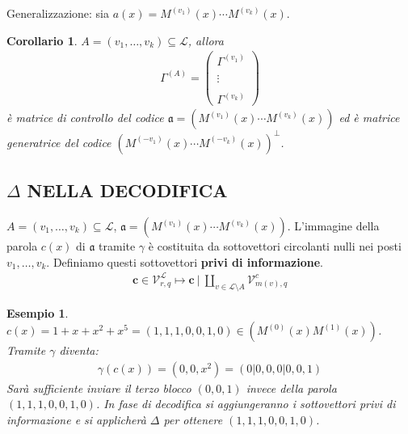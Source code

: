 \documentclass[mathserif]{beamer}
\newtheorem{esempio}{Esempio}
\newtheorem{corollario}{Corollario}
\begin{document}
\begin{frame}
  Generalizzazione: sia $a(x) = M^{(v_{1})}(x) \cdots M^{(v_{k})}(x)$. 

    \begin{corollario}
      $A=(v_{1}, \dots, v_{k}) \subseteq \mathscr{L}$, allora
      \begin{align*}
	  \Gamma^{(A)}
	  =
	  \left(
	  \begin{array} { c }
	  \Gamma^{(v_{1})}  \\ \\
	  \vdots \\ \\
	  \Gamma^{(v_{k})} 
	  \end{array}
	  \right)
      \end{align*}
      è matrice di controllo del codice $\mathfrak{a} = (  M^{(v_{1})}(x) \cdots M^{(v_{k})}(x) )$
      ed è matrice generatrice del codice $(  M^{(-v_{1})}(x)\cdots M^{(-v_{k})}(x) )^{\perp}$.
    \end{corollario}
\end{frame}




\subsection{$\Delta$ NELLA DECODIFICA}
\begin{frame}
   $A=(v_{1}, \dots, v_{k}) \subseteq \mathscr{L}$, $\mathfrak{a} = (  M^{(v_{1})}(x) \cdots  M^{(v_{k})}(x) )$.
   L'immagine della parola $c(x)$ di $\mathfrak{a}$ tramite $\gamma$ è costituita da sottovettori circolanti nulli nei posti $v_{1}, \dots, v_{k}$. Definiamo questi sottovettori {\bf privi di informazione}.
    \begin{align*}
      \mathbf{c} \in \mathcal{V}_{r, q}^{\mathscr{L}} 
      \mapsto 
      \mathbf{c} ~ \Bigg|~ \coprod_{v\in \mathscr{L} \setminus A} \mathcal{V}_{m(v), q}^{c}
    \end{align*}
\end{frame}



\begin{frame}
    \begin{esempio}
      $c(x) = 1 + x + x^2 + x^5 = (1,1,1,0,0,1,0)\in (M^{(0)}(x)M^{(1)}(x))$.\\ Tramite $\gamma$ diventa:
      \begin{align*}
	  \gamma(c(x)) = (0,0,x^2) = (0|0,0,0|0,0,1)
      \end{align*}
      Sarà sufficiente inviare il terzo blocco $(0,0,1)$ invece della parola $(1,1,1,0,0,1,0)$. In fase di decodifica si aggiungeranno i sottovettori privi di informazione e si applicherà $\Delta$ per ottenere $(1,1,1,0,0,1,0)$.
    \end{esempio}
\end{frame}
\end{document}
